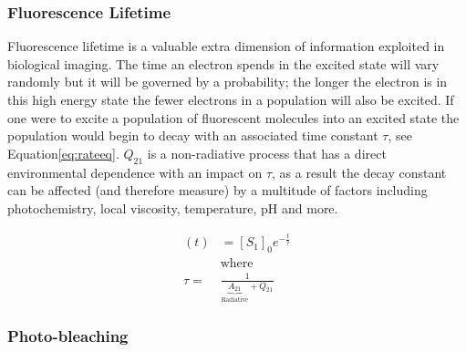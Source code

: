 

\subsubsection{Fluorescence Lifetime}\label{sec:lifetime}

Fluorescence lifetime is a valuable extra dimension of information exploited in biological imaging.
The time an electron spends in the excited state will vary randomly but it will be governed by a probability; the longer the electron is in this high energy state the fewer electrons in a population will also be excited.
If one were to excite a population of fluorescent molecules into an excited state the population would begin to decay with an associated time constant \(\tau\), see Equation\eqref{eq:rateeq}.
\(Q_{21}\) is a non-radiative process that has a direct environmental dependence with an impact on \(\tau\), as a result the decay constant can be affected (and therefore measure) by a multitude of factors including photochemistry, local viscosity\cite{Suhling2012}, temperature\cite{Schaerli2009}, pH and more.

\begin{align}
[S_1] (t) &= [S_1]_0 e^{-\frac{t}{\tau}}\label{eq:rateeq}\\
&\text{where}\nonumber\\
\tau = &\frac{1}{\underbrace{A_{21}}_{\text{Radiative}} + Q_{21}}
\end{align}

\subsubsection{Photo-bleaching} \label{sec:photobleaching}

